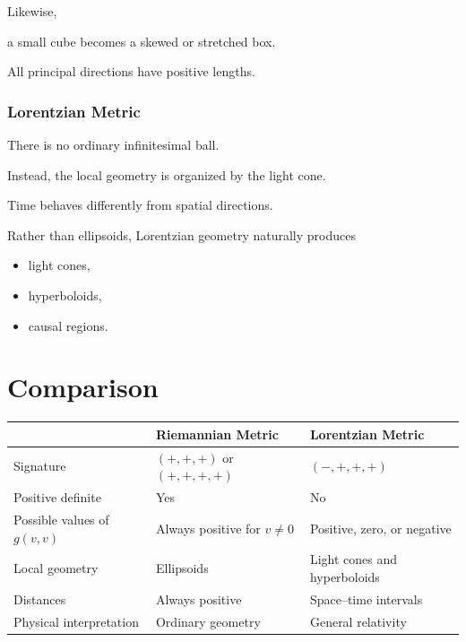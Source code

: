 \documentclass[12pt,a4paper]{article}
\theoremstyle{notespace}
\begin{document}
Likewise,

a small cube becomes a skewed or stretched box.

All principal directions have positive lengths.


\subsubsection*{Lorentzian Metric}

There is no ordinary infinitesimal ball.

Instead, the local geometry is organized by the light cone.

Time behaves differently from spatial directions.

Rather than ellipsoids, Lorentzian geometry naturally produces

\begin{itemize}
	\item light cones,
	\item hyperboloids,
	\item causal regions.
\end{itemize}


\section{Comparison}

\renewcommand{\arraystretch}{1.4}

\begin{center}
	\begin{tabular}{|p{4cm}|p{5cm}|p{5cm}|}
		\hline
		&
		\textbf{Riemannian Metric}
		&
		\textbf{Lorentzian Metric}
		\\
		\hline
		
		Signature
		&
		$(+,+,+)$ or $(+,+,+,+)$
		&
		$(-,+,+,+)$
		\\
		\hline
		
		Positive definite
		&
		Yes
		&
		No
		\\
		\hline
		
		Possible values of $g(v,v)$
		&
		Always positive for $v\neq0$
		&
		Positive, zero, or negative
		\\
		\hline
		
		Local geometry
		&
		Ellipsoids
		&
		Light cones and hyperboloids
		\\
		\hline
		
		Distances
		&
		Always positive
		&
		Space--time intervals
		\\
		\hline
		
		Physical interpretation
		&
		Ordinary geometry
		&
		General relativity
		\\
		\hline
		
	\end{tabular}
\end{center}
\end{document}
